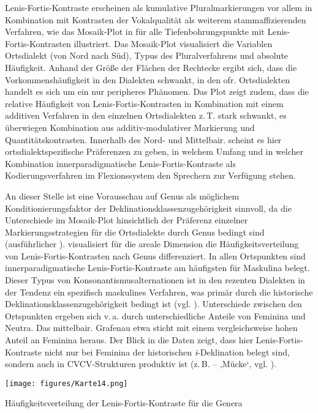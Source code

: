 Lenis-Fortis-Kontraste erscheinen als kumulative Pluralmarkierungen vor allem in Kombination mit Kontrasten der Vokalqualität als weiterem stammaffizierenden Verfahren, wie das Mosaik-Plot in   für alle Tiefenbohrungspunkte mit Lenis-Fortis-Kontrasten illustriert. Das Mosaik-Plot visualisiert die Variablen Ortsdialekt (von Nord nach Süd), Typus des Pluralverfahrens und absolute Häufigkeit. Anhand der Größe der Flächen der Rechtecke ergibt sich, dass die Vorkommenshäufigkeit in den Dialekten schwankt, in den ofr. Ortsdialekten handelt es sich um ein nur peripheres Phänomen. Das Plot zeigt zudem, dass die relative Häufigkeit von Lenis-Fortis-Kontrasten in Kombination mit einem additiven Verfahren in den einzelnen Ortsdialekten z.\,T. stark schwankt, es überwiegen Kombination aus additiv-modulativer Markierung und Quantitätskontrasten. Innerhalb des Nord- und Mittelbair. scheint es hier ortsdialektspezifische Präferenzen zu geben, in welchem Umfang und in welcher Kombination innerparadigmatische Lenis-Fortis-Kontraste als Kodierungsverfahren im Flexionssystem den Sprechern zur Verfügung stehen.

An dieser Stelle ist eine Vorausschau auf Genus als möglichem Konditionierungsfaktor der Deklinationsklassenzugehörigkeit sinnvoll, da die Unterschiede im Mosaik-Plot hinsichtlich der Präferenz einzelner Markierungsstrategien für die Ortsdialekte durch Genus bedingt sind (ausführlicher ).  visualisiert für die areale Dimension die Häufigkeitsverteilung
von Lenis-Fortis-Kontrasten nach Genus differenziert. In allen Ortspunkten sind innerparadigmatische Lenis-Fortis-Kontraste am häufigsten für Maskulina belegt. Dieser Typus von Konsonantismusalternationen ist in den rezenten Dialekten in der Tendenz ein spezifisch maskulines Verfahren, was primär durch die historische Deklinationsklassenzugehörigkeit bedingt ist (vgl. ). Unterschiede zwischen den Ortspunkten ergeben sich v.\,a. durch unterschiedliche Anteile von Feminina und Neutra. Das mittelbair. Grafenau etwa sticht mit einem vergleichsweise hohen Anteil an Feminina heraus. Der Blick in die Daten zeigt, dass hier Lenis-Fortis-Kontraste nicht nur bei Feminina der historischen \textit{i}{}-Deklination belegt sind, sondern auch in CVCV-Strukturen produktiv ist (z.\,B.  --  ‚Mücke‘, vgl. 	).

\begin{map}[p]
\centering\texttt{[image: figures/Karte14.png]}
\caption{Häufigkeitsverteilung der Lenis-Fortis-Kontraste für die Genera}
\label{map:14}
\end{map}

